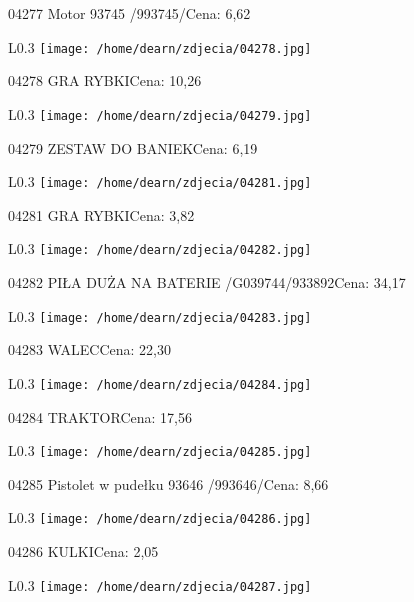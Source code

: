 04277 Motor 93745 /993745/Cena: 6,62\newline
\begin{wrapfigure}{L}{0.3\textwidth}
\texttt{[image: /home/dearn/zdjecia/04278.jpg]}
\end{wrapfigure}
04278 GRA RYBKICena: 10,26\newline
\begin{wrapfigure}{L}{0.3\textwidth}
\texttt{[image: /home/dearn/zdjecia/04279.jpg]}
\end{wrapfigure}
04279 ZESTAW DO BANIEKCena: 6,19\newline
\begin{wrapfigure}{L}{0.3\textwidth}
\texttt{[image: /home/dearn/zdjecia/04281.jpg]}
\end{wrapfigure}
04281 GRA RYBKICena: 3,82\newline
\begin{wrapfigure}{L}{0.3\textwidth}
\texttt{[image: /home/dearn/zdjecia/04282.jpg]}
\end{wrapfigure}
04282 PIŁA DUŻA NA BATERIE  /G039744/933892Cena: 34,17\newline
\begin{wrapfigure}{L}{0.3\textwidth}
\texttt{[image: /home/dearn/zdjecia/04283.jpg]}
\end{wrapfigure}
04283 WALECCena: 22,30\newline
\begin{wrapfigure}{L}{0.3\textwidth}
\texttt{[image: /home/dearn/zdjecia/04284.jpg]}
\end{wrapfigure}
04284 TRAKTORCena: 17,56\newline
\begin{wrapfigure}{L}{0.3\textwidth}
\texttt{[image: /home/dearn/zdjecia/04285.jpg]}
\end{wrapfigure}
04285 Pistolet w pudełku 93646 /993646/Cena: 8,66\newline
\begin{wrapfigure}{L}{0.3\textwidth}
\texttt{[image: /home/dearn/zdjecia/04286.jpg]}
\end{wrapfigure}
04286 KULKICena: 2,05\newline
\begin{wrapfigure}{L}{0.3\textwidth}
\texttt{[image: /home/dearn/zdjecia/04287.jpg]}
\end{wrapfigure}
